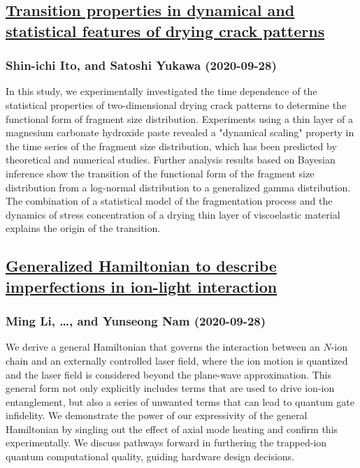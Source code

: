 \subsection*{\href{http://arxiv.org/abs/2009.13691v1}{Transition properties in dynamical and statistical features of drying  crack patterns}}
\subsubsection*{Shin-ichi Ito, and Satoshi Yukawa (2020-09-28)}
In this study, we experimentally investigated the time dependence of the
statistical properties of two-dimensional drying crack patterns to determine
the functional form of fragment size distribution. Experiments using a thin
layer of a magnesium carbonate hydroxide paste revealed a "dynamical scaling"
property in the time series of the fragment size distribution, which has been
predicted by theoretical and numerical studies. Further analysis results based
on Bayesian inference show the transition of the functional form of the
fragment size distribution from a log-normal distribution to a generalized
gamma distribution. The combination of a statistical model of the fragmentation
process and the dynamics of stress concentration of a drying thin layer of
viscoelastic material explains the origin of the transition.

\subsection*{\href{http://arxiv.org/abs/2009.13681v1}{Generalized Hamiltonian to describe imperfections in ion-light  interaction}}
\subsubsection*{Ming Li, \dots, and Yunseong Nam (2020-09-28)}
We derive a general Hamiltonian that governs the interaction between an
$N$-ion chain and an externally controlled laser field, where the ion motion is
quantized and the laser field is considered beyond the plane-wave
approximation. This general form not only explicitly includes terms that are
used to drive ion-ion entanglement, but also a series of unwanted terms that
can lead to quantum gate infidelity. We demonstrate the power of our
expressivity of the general Hamiltonian by singling out the effect of axial
mode heating and confirm this experimentally. We discuss pathways forward in
furthering the trapped-ion quantum computational quality, guiding hardware
design decisions.

